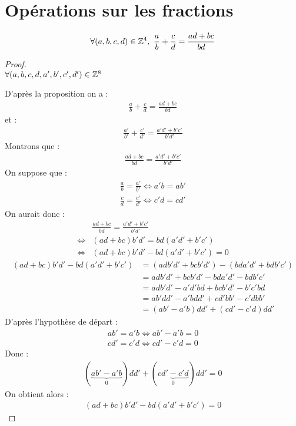 \section{Opérations sur les fractions}
\begin{proposition} 
	\begin{align*}
		\forall (a, b, c, d) \in \mathbb{Z}^4,\ \frac{a}{b} + \frac{c}{d} = \frac{ad + bc}{bd}
	\end{align*}
\end{proposition}
\begin{proof}~
	\\
	$\forall (a, b, c, d, a', b', c', d') \in \mathbb{Z}^8$
	
	\noindent D'après la proposition on a :
	\begin{align*}
		\frac{a}{b} + \frac{c}{d} = \frac{ad + bc}{bd}
	\end{align*}
	et :
	\begin{align*}
		\frac{a'}{b'} + \frac{c'}{d'} = \frac{a'd' + b'c'}{b'd'}
	\end{align*}
	Montrons que : 
	\begin{align*}
		\frac{ad + bc}{bd} = \frac{a'd' + b'c'}{b'd'}
	\end{align*}
	On suppose que : 
	\begin{align*}
		\frac{a}{b} = \frac{a'}{b'} \iff a'b = ab' \\
		\frac{c}{d} = \frac{c'}{d'} \iff c'd = cd'
	\end{align*}
	On aurait donc :
	\begin{align*}
		&\frac{ad + bc}{bd} = \frac{a'd' + b'c'}{b'd'} \\
		\iff &(ad + bc)b'd' = bd(a'd' + b'c') \\
		\iff &(ad + bc)b'd' - bd(a'd' + b'c') = 0
	\end{align*}
	\begin{align*}
		(ad + bc)b'd' - bd(a'd' + b'c') &= (adb'd' + bcb'd') - (bda'd' + bdb'c')\\
		&= adb'd' + bcb'd' - bda'd' - bdb'c' \\
		&= adb'd' - a'd'bd + bcb'd' - b'c'bd \\
		&= ab'dd' - a'bdd' + cd'bb' - c'dbb' \\
		&= (ab' - a'b)dd' + (cd' - c'd)dd'
	\end{align*}
	D'après l'hypothèse de départ :
	\begin{align*}
		ab' = a'b \iff ab' - a'b = 0 \\
		cd' = c'd \iff cd' - c'd = 0
	\end{align*}
	Donc : 
	\begin{align*}
		(\underbrace{ab' - a'b}_{0})dd' + (\underbrace{cd' - c'd}_0)dd' = 0
	\end{align*}
	On obtient alors :
	\begin{align*}
		(ad + bc)b'd' - bd(a'd' + b'c') = 0
	\end{align*}
\end{proof}

